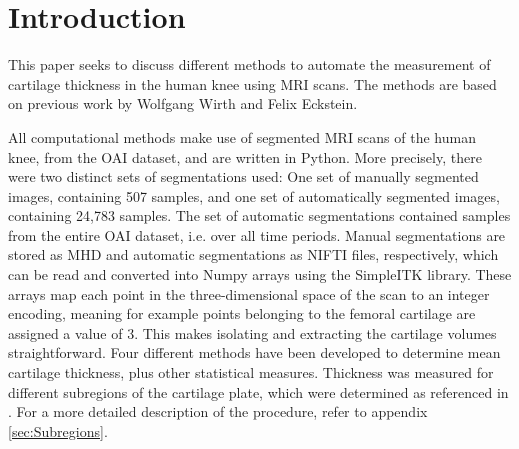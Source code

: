 \section{Introduction}
\label{sec:Introduction}
This paper seeks to discuss different methods to automate the measurement of cartilage thickness in the human knee using MRI scans. The methods are based on previous work by Wolfgang Wirth and Felix Eckstein. \cite{wirth2008technique}
\par\noindent
All computational methods make use of segmented MRI scans of the human knee, from the OAI dataset, and are written in Python. More precisely, there were two distinct sets of segmentations used: One set of manually segmented images, containing 507 samples, and one set of automatically segmented images, containing 24,783 samples. The set of automatic segmentations contained samples from the entire OAI dataset, i.e. over all time periods. Manual segmentations are stored as MHD and automatic segmentations as NIFTI files, respectively, which can be read and converted into Numpy arrays using the SimpleITK library. These arrays map each point in the three-dimensional space of the scan to an integer encoding, meaning for example points belonging to the femoral cartilage are assigned a value of 3. This makes isolating and extracting the cartilage volumes straightforward. Four different methods have been developed to determine mean cartilage thickness, plus other statistical measures. Thickness was measured for different subregions of the cartilage plate, which were determined as referenced in \cite{wirth2008technique}. For a more detailed description of the procedure, refer to appendix \ref{sec:Subregions}. 

